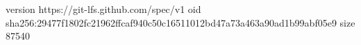 version https://git-lfs.github.com/spec/v1
oid sha256:29477f1802fc21962ffcaf940c50c16511012bd47a73a463a90ad1b99abf05e9
size 87540
